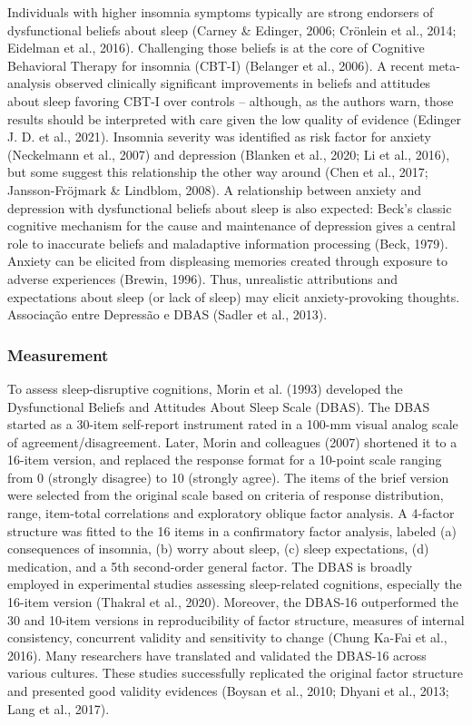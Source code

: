 \documentclass[
  ,doc,11pt, twoside,floatsintext]{apa6}
\begin{document}
Individuals with higher insomnia symptoms typically are strong endorsers of dysfunctional beliefs about sleep (Carney \& Edinger, 2006; Crönlein et al., 2014; Eidelman et al., 2016). Challenging those beliefs is at the core of Cognitive Behavioral Therapy for insomnia (CBT-I) (Belanger et al., 2006). A recent meta-analysis observed clinically significant improvements in beliefs and attitudes about sleep favoring CBT-I over controls -- although, as the authors warn, those results should be interpreted with care given the low quality of evidence (Edinger J. D. et al., 2021). Insomnia severity was identified as risk factor for anxiety (Neckelmann et al., 2007) and depression (Blanken et al., 2020; Li et al., 2016), but some suggest this relationship the other way around (Chen et al., 2017; Jansson-Fröjmark \& Lindblom, 2008). A relationship between anxiety and depression with dysfunctional beliefs about sleep is also expected: Beck's classic cognitive mechanism for the cause and maintenance of depression gives a central role to inaccurate beliefs and maladaptive information processing (Beck, 1979). Anxiety can be elicited from displeasing memories created through exposure to adverse experiences (Brewin, 1996). Thus, unrealistic attributions and expectations about sleep (or lack of sleep) may elicit anxiety-provoking thoughts. Associação entre Depressão e DBAS (Sadler et al., 2013).

\hypertarget{measurement}{%
\subsubsection{Measurement}\label{measurement}}

To assess sleep-disruptive cognitions, Morin et al. (1993) developed the Dysfunctional Beliefs and Attitudes About Sleep Scale (DBAS). The DBAS started as a 30-item self-report instrument rated in a 100-mm visual analog scale of agreement/disagreement. Later, Morin and colleagues (2007) shortened it to a 16-item version, and replaced the response format for a 10-point scale ranging from 0 (strongly disagree) to 10 (strongly agree). The items of the brief version were selected from the original scale based on criteria of response distribution, range, item-total correlations and exploratory oblique factor analysis. A 4-factor structure was fitted to the 16 items in a confirmatory factor analysis, labeled (a) consequences of insomnia, (b) worry about sleep, (c) sleep expectations, (d) medication, and a 5th second-order general factor. The DBAS is broadly employed in experimental studies assessing sleep-related cognitions, especially the 16-item version (Thakral et al., 2020). Moreover, the DBAS-16 outperformed the 30 and 10-item versions in reproducibility of factor structure, measures of internal consistency, concurrent validity and sensitivity to change (Chung Ka-Fai et al., 2016). Many researchers have translated and validated the DBAS-16 across various cultures. These studies successfully replicated the original factor structure and presented good validity evidences (Boysan et al., 2010; Dhyani et al., 2013; Lang et al., 2017).
\end{document}
